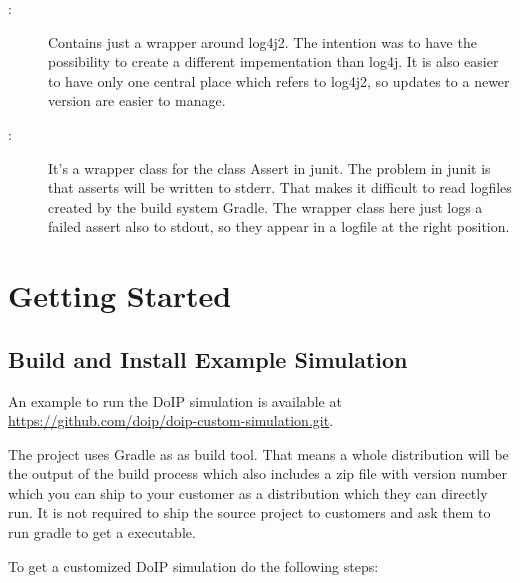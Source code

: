 \documentclass[a4paper]{doipdoc}
\begin{document}
\begin{description}
		\item[:] Contains just a wrapper around 
		log4j2. The intention was to have the possibility to create
		a different impementation than log4j. It is also easier to
		have only one central place which refers to log4j2, so updates 
		to a newer version are easier to manage.

		\item[:] It's a wrapper class for the class
		Assert in junit. The problem in junit is that asserts will be written
		to stderr. That makes it difficult to read logfiles created
		by the build system Gradle. The wrapper class here just logs
		a failed assert also to stdout, so they appear in a logfile at
		the right position.

	\end{description}

\section{Getting Started}

	\subsection{Build and Install Example Simulation}

		An example to run the DoIP simulation is available at 
		\url{https://github.com/doip/doip-custom-simulation.git}.

		The project uses Gradle as as build tool. That means a whole
		distribution will be the output of the build process which also
		includes a zip file with version number which you can ship
		to your customer as a distribution which they can directly run.
		It is not required to ship the source project to customers and
		ask them to run gradle to get a executable.

		To get a customized DoIP simulation do the following steps:
\end{document}

